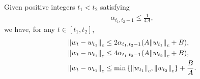 \documentclass[twoside,11pt]{article}
\numberwithin{assucounter}{section}
\begin{document}
\begin{lemma}
  \label{lem bound of xk diff}
  Given positive integers $t_1 < t_2$ satisfying
  \begin{align}
      \alpha_{t_1, t_2 - 1} \leq \frac{1}{4A},
  \end{align}
  we have, for any $t \in [t_1, t_2]$,
  \begin{align}
      \label{eq bound of xk diff1}
      \norm{w_t - w_{t_1}}_c &\leq 2 \alpha_{t_1, t_2 - 1}(A\norm{w_{t_1}}_c + B), \\
      \label{eq bound of xk diff2}
      \norm{w_t - w_{t_1}}_c &\leq 4 \alpha_{t_1, t_2 - 1}(A \norm{w_{t_2}}_c + B), \\
      \label{eq bound of xk diff3}
      \norm{w_t - w_{t_1}}_c &\leq \min \qty{\norm{w_{t_1}}_c, \norm{w_{t_2}}_c } + \frac{B}{A}.
  \end{align}
\end{lemma}
\end{document}
